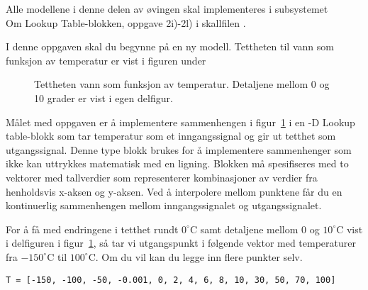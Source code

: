 
\item[]   Alle modellene i denne delen av øvingen skal implementeres
  i subsystemet\\
  {\sf  Om Lookup Table-blokken, oppgave 2i)-2l)} i 
  skallfilen .


\item
  I denne oppgaven skal du begynne på en ny modell.
  Tettheten til vann som funksjon av temperatur er vist i figuren
  under
  \begin{figure}[H]
    \centering
    \caption{Tettheten vann som funksjon av temperatur. Detaljene mellom
      0 og 10 grader er vist i egen delfigur.}   
    \label{fig:tetthet_vann}
  \end{figure}

  Målet med oppgaven er å implementere sammenhengen i
  figur~\ref{fig:tetthet_vann} i en {-D Lookup table}-blokk
  som tar temperatur som et inngangssignal og gir ut tetthet som
  utgangssignal. Denne type blokk brukes for å implementere sammenhenger
  som ikke kan uttrykkes matematisk med en ligning.
  Blokken må spesifiseres med to vektorer med
  tallverdier som representerer kombinasjoner av verdier fra henholdsvis
  x-aksen og
  y-aksen. Ved å interpolere mellom punktene får du en kontinuerlig
  sammenhengen mellom inngangssignalet og 
  utgangssignalet.

  For å få med endringene i tetthet rundt $0^{\circ}$C
  samt detaljene mellom 0 og $10^{\circ}$C vist i  delfiguren i
  figur~\ref{fig:tetthet_vann}, så tar vi 
  utgangspunkt i følgende vektor med 
  temperaturer fra $-150^{\circ}$C til 
  $100^{\circ}$C. Om du vil kan du legge inn flere punkter selv. 

  {\tt T = [-150, -100, -50, -0.001, 0, 2, 4, 6, 8, 10, 30, 50, 70, 100]}

